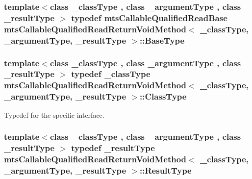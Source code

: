 \subsubsection[{Base\+Type}]{\setlength{\rightskip}{0pt plus 5cm}template$<$class \+\_\+class\+Type , class \+\_\+argument\+Type , class \+\_\+result\+Type $>$ typedef {\bf mts\+Callable\+Qualified\+Read\+Base} {\bf mts\+Callable\+Qualified\+Read\+Return\+Void\+Method}$<$ \+\_\+class\+Type, \+\_\+argument\+Type, \+\_\+result\+Type $>$\+::{\bf Base\+Type}}\label{classmts_callable_qualified_read_return_void_method_ac485c35956ba406a7863f66264b290d4}
\hypertarget{classmts_callable_qualified_read_return_void_method_ae99cfab8208eb374f2cdf01c97edfa3b}{}
\subsubsection[{Class\+Type}]{\setlength{\rightskip}{0pt plus 5cm}template$<$class \+\_\+class\+Type , class \+\_\+argument\+Type , class \+\_\+result\+Type $>$ typedef \+\_\+class\+Type {\bf mts\+Callable\+Qualified\+Read\+Return\+Void\+Method}$<$ \+\_\+class\+Type, \+\_\+argument\+Type, \+\_\+result\+Type $>$\+::{\bf Class\+Type}}\label{classmts_callable_qualified_read_return_void_method_ae99cfab8208eb374f2cdf01c97edfa3b}
Typedef for the specific interface. \hypertarget{classmts_callable_qualified_read_return_void_method_a533ffd51ea529b0a585985eaf06ab08f}{}
\subsubsection[{Result\+Type}]{\setlength{\rightskip}{0pt plus 5cm}template$<$class \+\_\+class\+Type , class \+\_\+argument\+Type , class \+\_\+result\+Type $>$ typedef \+\_\+result\+Type {\bf mts\+Callable\+Qualified\+Read\+Return\+Void\+Method}$<$ \+\_\+class\+Type, \+\_\+argument\+Type, \+\_\+result\+Type $>$\+::{\bf Result\+Type}}\label{classmts_callable_qualified_read_return_void_method_a533ffd51ea529b0a585985eaf06ab08f}
\hypertarget{classmts_callable_qualified_read_return_void_method_a916abe9c683c314f85c9b67c960a67f9}{}
